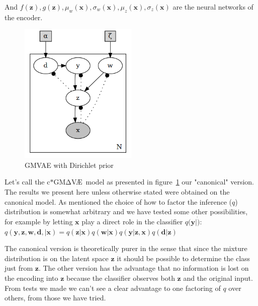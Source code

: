 \documentclass[11pt, a4paper]{report}
\theoremstyle{plain}
\theoremstyle{definition}
\theoremstyle{remark}
\newcommand{\x}{\mathbf{x}}
\newcommand{\z}{\mathbf{z}}
\newcommand{\y}{\mathbf{y}}
\newcommand{\w}{\mathbf{w}}
\newcommand{\dd}{\mathbf{d}}
\newcommand{\gmvae}{c$\ast$GM$\mathrm{\Delta}$V\AE~}
\begin{document}
And $f(\z),g(\z), \mu_w(\x), \sigma_w(\x), \mu_z(\x), \sigma_z(\x)$ are
the neural networks of the encoder.


\begin{figure}[H]
\centering
\includegraphics[width=0.5\textwidth]{plots/dirichlet_gmm.gv.png}
\caption{GMVAE with Dirichlet prior}
\label{fig:dirgmm}
\end{figure}

Let's call the \gmvae model as presented in figure~\ref{fig:dirgmm} our
"canonical" version. The results we present here unless otherwise stated were
obtained on the canonical model. As mentioned the choice of how to factor the
inference ($q$) distribution is somewhat arbitrary and we have tested some other
possibilities, for example by letting $\x$ play a direct role in the
classifier $q(\y | \dot)$:
$q(\y, \z, \w, \dd, | \x) = 
q(\z | \x)q(\w | \x)q(\y | \z, \x)q(\dd | \z)$ 

The canonical version is theoretically purer in the sense that since the
mixture distribution is on the latent space $\z$ it should be possible to
determine the class just from $\z$. The other version has the advantage that no
information is lost on the encoding into $\z$ because the classifier observes
both $\z$ and the original input. From tests we made we can't see a clear
advantage to one factoring of $q$ over others, from those we have tried.
\end{document}
